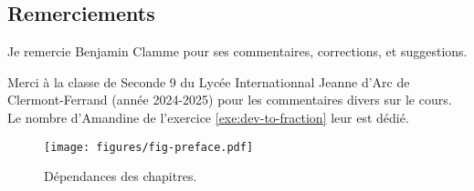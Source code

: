 \subsection*{Remerciements}

Je remercie Benjamin Clamme pour ses commentaires, corrections, et suggestions.

Merci à la classe de Seconde 9 du Lycée Internationnal Jeanne d'Arc de Clermont-Ferrand (année 2024-2025) pour les commentaires divers sur le cours.
Le nombre d'Amandine de l'exercice \ref{exe:dev-to-fraction} leur est dédié.

\newpage
\begin{figure}
	\centering
	\texttt{[image: figures/fig-preface.pdf]}
	\caption{Dépendances des chapitres.}
\end{figure}
	